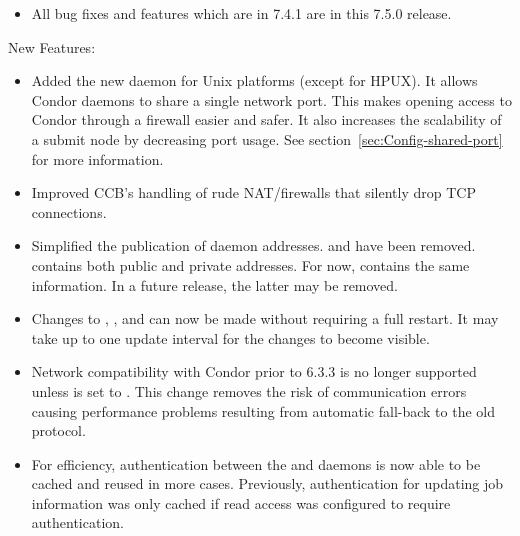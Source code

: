 \begin{itemize}

\item All bug fixes and features which are in 7.4.1 are in this 7.5.0 release.

\end{itemize}


\noindent New Features:

\begin{itemize}

\item Added the new daemon  for Unix platforms 
  (except for HPUX).
  It allows Condor daemons to share a
  single network port.  This makes opening access to Condor through a
  firewall easier and safer.  It also increases the scalability of a
  submit node by decreasing port usage. See
  section~\ref{sec:Config-shared-port} for more information.

\item Improved CCB's handling of rude NAT/firewalls that silently drop
TCP connections.

\item Simplified the publication of daemon addresses.
   and  have been removed.
   contains both public and private addresses.  For now,
   contains the same information.  In a future release,
  the latter may be removed.

\item Changes to ,
  , and
   can now be made without requiring a
  full restart.  It may take up to one  update interval 
  for the changes to become visible.

\item Network compatibility with Condor prior to 6.3.3 is no longer
  supported unless  is set to
  .  This change removes the risk of communication errors
  causing performance problems resulting from automatic fall-back to the
  old protocol.

\item For efficiency, authentication between the  and
   daemons is now able to be cached and reused in more
  cases.  Previously, authentication for updating job information was
  only cached if read access was configured to require authentication.


\end{itemize}
